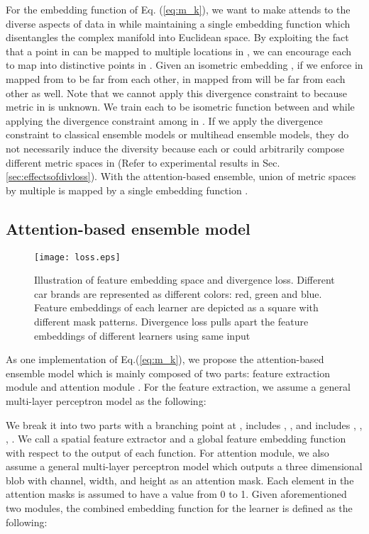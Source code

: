 \documentclass[runningheads]{llncs}
\begin{document}
For the embedding function of Eq. (\ref{eq:m_k}), we want to make  attends to the diverse aspects of data  in 
 while maintaining a single embedding function  which disentangles the complex manifold  into Euclidean space.
By exploiting the fact that a point  in  can be mapped to multiple locations in ,
 we can encourage each  to map  into distinctive points  in .
Given an isometric embedding  ,
 if we enforce  in  mapped from  to be far from each other,
  in  mapped from  will be far from each other as well.
Note that we cannot apply this divergence constraint to  because metric  in  is unknown.
 We train each  to be isometric function between  and 
 while applying the divergence constraint among  in .
If we apply the divergence constraint to classical ensemble models or multihead ensemble models,
 they do not necessarily induce the diversity because each  or  could
 arbitrarily compose different metric spaces in  (Refer to experimental results in Sec. \ref{sec:effectsofdivloss}).
With the attention-based ensemble, union of metric spaces by multiple  is mapped by a single embedding function .

\vspace{-4mm}
\subsection{Attention-based ensemble model}
\label{sec:model}
\vspace{-2mm}

\begin{figure}[t]
\centering
\texttt{[image: loss.eps]}
\vspace{-3mm}
\caption{Illustration of feature embedding space and divergence loss. Different car brands are represented as different colors: red, green and blue. Feature embeddings of each learner are depicted as a square with different mask patterns. Divergence loss pulls apart the feature embeddings of different learners using same input}
\vspace{-5mm}
\label{fig:loss}
\end{figure}


As one implementation of Eq.(\ref{eq:m_k}), we propose the attention-based ensemble model which is mainly composed of two parts:
 feature extraction module  and attention module . For the feature extraction, we assume a general multi-layer perceptron model as the following:
\vspace{-2mm}


We break it into two parts with a branching point at ,  includes , ,
 and  includes , , , .
We call  a spatial feature extractor and  a global feature embedding function
 with respect to the output of each function. For attention module,
 we also assume a general multi-layer perceptron model which outputs a three dimensional blob with channel, width, and height as an attention mask.
Each element in the attention masks is assumed to have a value from 0 to 1.
Given aforementioned two modules, the combined embedding function  for the learner  is defined as the following:
\vspace{-2mm}
\end{document}
